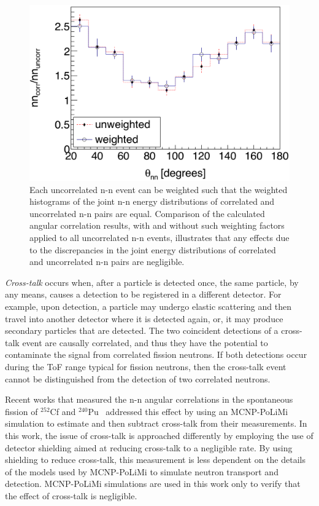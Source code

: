 \begin{figure}[]
\centering
    \includegraphics[width=\figsize\textwidth]{WeightedErgDiff.png}
    \caption{
Each uncorrelated n-n event can be weighted such that the weighted histograms of the joint n-n energy distributions of correlated and uncorrelated n-n pairs are equal.
Comparison of the calculated angular correlation results, with and without such weighting factors applied to all uncorrelated n-n events, illustrates that any effects due to the discrepancies in the joint energy distributions of correlated and uncorrelated n-n pairs are negligible.
    }
    \label{fig:WeightedErgDiff}
\end{figure}

\label{crosstalk}
\textit{Cross-talk} occurs when, after a particle is detected once, the same particle, by any means, causes a detection to be registered in a different detector.
For example, upon detection, a particle may undergo elastic scattering and then travel into another detector where it is detected again, or, it may produce secondary particles that are detected.
The two coincident detections of a cross-talk event are causally correlated, and thus they have the potential to contaminate the signal from correlated fission neutrons.
If both detections occur during the ToF range typical for fission neutrons, then the cross-talk event cannot be distinguished from the detection of two correlated neutrons.

Recent works that measured the n-n angular correlations in the spontaneous fission of $^{252}$Cf and $^{240}$Pu~\cite{Pozzi2016,Verbeke2018} addressed this effect by using an MCNP-PoLiMi simulation to estimate and then subtract cross-talk from their measurements.
In this work, the issue of cross-talk is approached differently by employing the use of detector shielding aimed at reducing cross-talk to a negligible rate.
By using shielding to reduce cross-talk, this measurement is less dependent on the details of the models used by MCNP-PoLiMi to simulate neutron transport and detection.
MCNP-PoLiMi simulations are used in this work only to verify that the effect of cross-talk is negligible.

